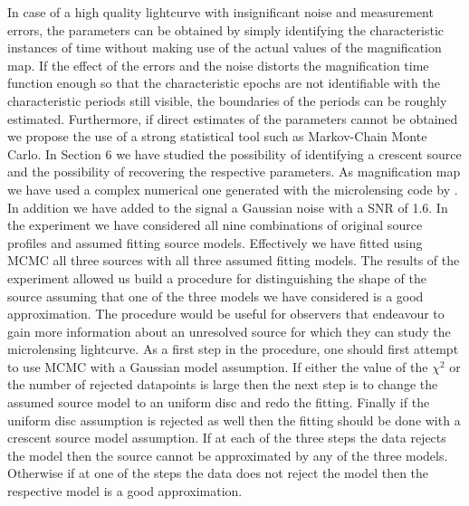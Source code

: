 In case of a high quality lightcurve with insignificant noise and measurement errors, the parameters can be obtained 
by simply identifying the characteristic instances of time without making use of the actual values of the magnification
 map. If the effect of the errors and the noise distorts the magnification time function enough so that the 
characteristic epochs are not identifiable with the characteristic periods still visible, the boundaries of the periods 
can be roughly estimated. Furthermore, if direct estimates of the parameters cannot be obtained we propose the use of a strong
statistical tool such as Markov-Chain Monte Carlo. In Section 6  we have studied the possibility of identifying a crescent 
source and  the possibility of recovering the respective parameters. As magnification map we have used a complex numerical 
one generated with the microlensing code by \cite{1999A&A...346L...5W}. In addition we have added to the signal a Gaussian 
noise with a SNR of 1.6.  In the experiment we have considered all nine combinations of original source profiles and assumed fitting source models.
Effectively we have fitted using MCMC all three sources with all three assumed fitting models. The results of the experiment allowed us build a 
procedure for distinguishing the shape of the source assuming that one of the three models we have considered is a good approximation.  
The procedure would be useful for observers that endeavour to gain more information about an unresolved source for which they can study 
the microlensing lightcurve.  As a first step in the procedure, one should first attempt to use MCMC with a Gaussian model assumption. 
If either the value of the $\chi^2$ or the number of rejected datapoints is large then the next step is to change the assumed source model to 
an uniform disc and redo the fitting. Finally if the uniform disc assumption is rejected as well then the fitting should be done with a 
crescent source model assumption. If at each of the three steps the data rejects the model then the source cannot be approximated by any of the three models. 
Otherwise if at one of the steps the data does not reject the model then the respective model is a good approximation.   


